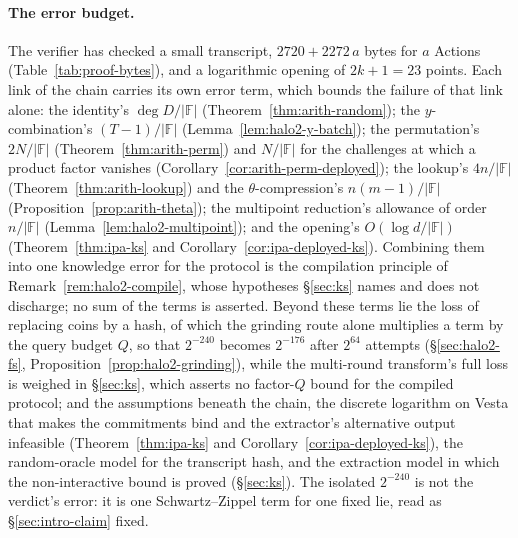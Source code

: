 \documentclass[11pt,a4paper]{article}
\theoremstyle{definition}
\newcommand{\F}{\mathbb{F}}
\begin{document}
\paragraph{The error budget.}
The verifier has checked a small transcript, $2720 + 2272\,a$ bytes for
$a$ Actions (Table~\ref{tab:proof-bytes}), and a logarithmic opening
of $2k + 1 = 23$ points. Each link of the chain carries its own error
term, which bounds the failure of that link alone: the identity's
$\deg D/|\F|$ (Theorem~\ref{thm:arith-random}); the $y$-combination's
$(T - 1)/|\F|$ (Lemma~\ref{lem:halo2-y-batch}); the permutation's
$2N/|\F|$ (Theorem~\ref{thm:arith-perm}) and $N/|\F|$ for the challenges
at which a product factor vanishes
(Corollary~\ref{cor:arith-perm-deployed});
the lookup's $4n/|\F|$ (Theorem~\ref{thm:arith-lookup}) and the
$\theta$-compression's $n(m - 1)/|\F|$
(Proposition~\ref{prop:arith-theta}); the multipoint reduction's
allowance of order $n/|\F|$ (Lemma~\ref{lem:halo2-multipoint}); and the
opening's $O(\log d/|\F|)$ (Theorem~\ref{thm:ipa-ks} and
Corollary~\ref{cor:ipa-deployed-ks}). Combining them
into one knowledge error for the protocol is the compilation principle
of Remark~\ref{rem:halo2-compile}, whose hypotheses \S\ref{sec:ks} names
and does not discharge; no sum of the terms is asserted. Beyond these
terms lie the loss of replacing coins by a hash, of which the grinding
route alone multiplies a term by the query budget $Q$, so that
$2^{-240}$ becomes $2^{-176}$ after $2^{64}$ attempts
(\S\ref{sec:halo2-fs}, Proposition~\ref{prop:halo2-grinding}), while
the multi-round transform's full loss is weighed in \S\ref{sec:ks},
which asserts no factor-$Q$ bound for the compiled protocol; and the
assumptions beneath the chain, the discrete logarithm on Vesta that
makes the commitments bind and the extractor's alternative output
infeasible (Theorem~\ref{thm:ipa-ks} and
Corollary~\ref{cor:ipa-deployed-ks}), the random-oracle model for the
transcript hash, and the extraction model in which the non-interactive
bound is proved (\S\ref{sec:ks}). The isolated $2^{-240}$ is not the
verdict's error: it is one Schwartz--Zippel term for one fixed lie, read
as \S\ref{sec:intro-claim} fixed.
\end{document}
